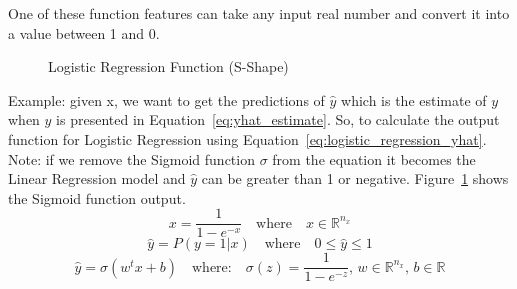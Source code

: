 One of these function features can take any input real number and convert it into a value between 1 and 0.%
\begin{figure}
\centering

\caption{Logistic Regression Function (S-Shape)}\label{Fig:Logistic}
\end{figure}%

Example: given x, we want to get the predictions of $\widehat{y}$ which is the estimate of $y$ when $\widehat{y}$ is presented in Equation~\eqref{eq:yhat_estimate}. So, to calculate the output function for Logistic Regression using Equation~\eqref{eq:logistic_regression_yhat}. Note: if we remove the Sigmoid function $\sigma$ from the equation it becomes the Linear Regression model and $\widehat{y}$ can be greater than 1 or negative. Figure~\ref{Fig:Logistic} shows the Sigmoid function output.%
\begin{equation}\label{eq:logistic_function}
 x = \frac{1}{1-e^{-x}} \quad \text{where} \quad x \in \mathbb{R}^{n_x} 
\end{equation}
\begin{equation}
 \label{eq:yhat_estimate}
  \widehat{y} = P(y=1 | x) \quad \text{where} \quad 0 \le \widehat{y} \le 1
 \end{equation}
\begin{equation}
 \label{eq:logistic_regression_yhat}
 \widehat{y} = \sigma(w^t x + b) \quad \text{where:} \quad \sigma(z) = \frac{1}{1-e^{-z}} \text{, } w \in \mathbb{R}^{n_x} \text{, } b \in \mathbb{R} 
\end{equation}%
%
